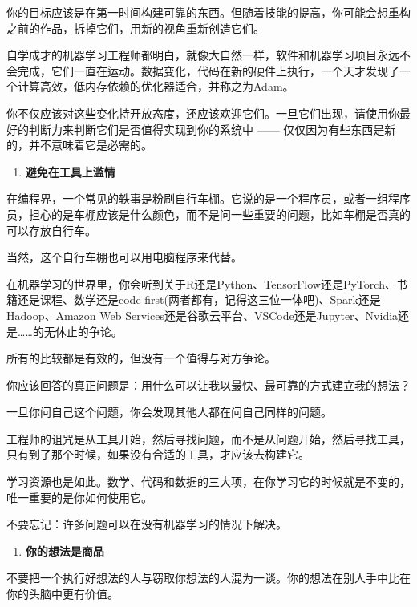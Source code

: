 \documentclass[]{ctexbook}
\providecommand{\tightlist}{%
  \setlength{\itemsep}{0pt}\setlength{\parskip}{0pt}}
\begin{document}
你的目标应该是在第一时间构建可靠的东西。但随着技能的提高，你可能会想重构之前的作品，拆掉它们，用新的视角重新创造它们。

自学成才的机器学习工程师都明白，就像大自然一样，软件和机器学习项目永远不会完成，它们一直在运动。数据变化，代码在新的硬件上执行，一个天才发现了一个计算高效，低内存依赖的优化器适合，并称之为Adam。

你不仅应该对这些变化持开放态度，还应该欢迎它们。一旦它们出现，请使用你最好的判断力来判断它们是否值得实现到你的系统中 ------ 仅仅因为有些东西是新的，并不意味着它是必需的。

\begin{enumerate}
\def\labelenumi{\arabic{enumi}.}
\setcounter{enumi}{6}
\tightlist
\item
  \textbf{避免在工具上滥情}
\end{enumerate}

在编程界，一个常见的轶事是粉刷自行车棚。它说的是一个程序员，或者一组程序员，担心的是车棚应该是什么颜色，而不是问一些重要的问题，比如车棚是否真的可以存放自行车。

当然，这个自行车棚也可以用电脑程序来代替。

在机器学习的世界里，你会听到关于R还是Python、TensorFlow还是PyTorch、书籍还是课程、数学还是code first(两者都有，记得这三位一体吧)、Spark还是Hadoop、Amazon Web Services还是谷歌云平台、VSCode还是Jupyter、Nvidia还是\ldots{}\ldots{}的无休止的争论。

所有的比较都是有效的，但没有一个值得与对方争论。

你应该回答的真正问题是：用什么可以让我以最快、最可靠的方式建立我的想法？

一旦你问自己这个问题，你会发现其他人都在问自己同样的问题。

工程师的诅咒是从工具开始，然后寻找问题，而不是从问题开始，然后寻找工具，只有到了那个时候，如果没有合适的工具，才应该去构建它。

学习资源也是如此。数学、代码和数据的三大项，在你学习它的时候就是不变的，唯一重要的是你如何使用它。

不要忘记：许多问题可以在没有机器学习的情况下解决。

\begin{enumerate}
\def\labelenumi{\arabic{enumi}.}
\setcounter{enumi}{7}
\tightlist
\item
  \textbf{你的想法是商品}
\end{enumerate}

不要把一个执行好想法的人与窃取你想法的人混为一谈。你的想法在别人手中比在你的头脑中更有价值。
\end{document}
